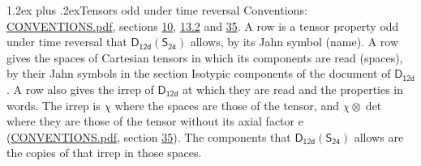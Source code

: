 \documentclass[10pt,a4paper]{article}
\makeatletter
\renewcommand\section{\@startsection{section}{1}{\z@}{-3ex plus -1ex minus -.2ex}%
  {1.2ex plus .2ex}{\normalfont\large\sffamily\bfseries\color{parttitle}}}
\numberwithin{equation}{section}
\newcommand{\grp}[1]{\mathsf{#1}}
\newcommand{\irrprod}{\otimes}
\makeatother
\begin{document}
\section{Tensors odd under time reversal}\label{s:time_odd}
Conventions: \href{../../CONVENTIONS.pdf}{CONVENTIONS.pdf}, sections \href{../../../rotation/CONVENTIONS.pdf\#conv.10}{10}, \href{../../../rotation/CONVENTIONS.pdf\#conv.13.2}{13.2} and \href{../../CONVENTIONS.pdf\#conv.35}{35}.
\leavevmode\label{n:head.name.property}A row is a tensor property odd under time reversal that $\grp{D_{12d}}(\grp{S_{24}})$ allows, by its Jahn symbol (name). \label{n:head.spaces}A row gives the spaces of Cartesian tensors in which its components are read (spaces), by their Jahn symbols in the section Isotypic components of the document of \href{../../../rotation/data/pdf/D12d.pdf}{$\grp{D_{12d}}$}. \label{n:head.properties}A row also gives the irrep of $\grp{D_{12d}}$ at which they are read and the properties in words. The irrep is $\chi$ where the spaces are those of the tensor, and $\chi \irrprod \det$ where they are those of the tensor without its axial factor e (\href{../../CONVENTIONS.pdf}{CONVENTIONS.pdf}, section \href{../../CONVENTIONS.pdf\#conv.35}{35}). The components that $\grp{D_{12d}}(\grp{S_{24}})$ allows are the copies of that irrep in those spaces.
\end{document}
